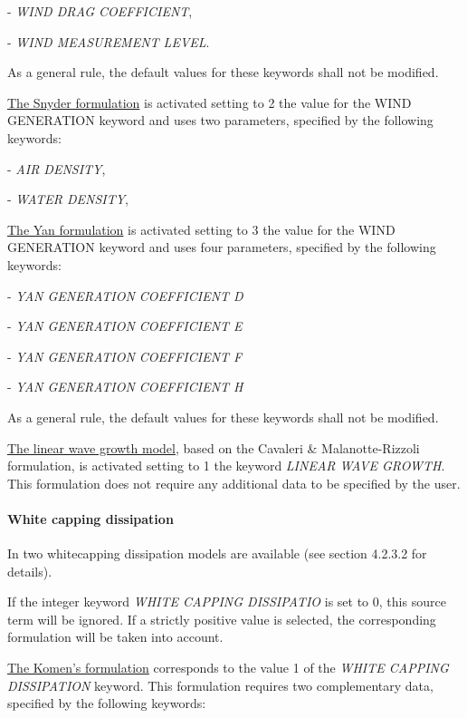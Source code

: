 - \textit{WIND DRAG COEFFICIENT},  

- \textit{WIND MEASUREMENT LEVEL}.  

  \textit{}

As a general rule, the default values for these keywords shall not be modified.

 \underline{ The Snyder formulation} is activated setting to 2 the value for the WIND GENERATION keyword and uses two parameters, specified by the following keywords:   

- \textit{AIR DENSITY},   

- \textit{WATER DENSITY},

   \textit{}

\underline{ The Yan formulation} is activated setting to 3 the value for the WIND GENERATION keyword and uses four parameters, specified by the following keywords:   

- \textit{YAN GENERATION COEFFICIENT D}  

- \textit{YAN GENERATION COEFFICIENT E} 

- \textit{YAN GENERATION COEFFICIENT F} 

- \textit{YAN GENERATION COEFFICIENT H}

  \textit{}

As a general rule, the default values for these keywords shall not be modified.

\underline{  The linear wave growth model}, based on the Cavaleri \& Malanotte-Rizzoli formulation, is activated setting to 1 the keyword \textit{LINEAR WAVE GROWTH}. This formulation does not require any additional data to be specified by the user.


\paragraph{ White capping dissipation}

 In \tomawac two whitecapping dissipation models are available (see section 4.2.3.2 for details).

 If the integer keyword \textit{WHITE CAPPING DISSIPATIO} is set to 0, this source term will be ignored. If a strictly positive value is selected, the corresponding formulation will be taken into account.

 \underline{  The Komen's formulation} corresponds to the value 1 of the \textit{WHITE CAPPING DISSIPATION} keyword. This formulation requires two complementary data, specified by the following keywords:   

